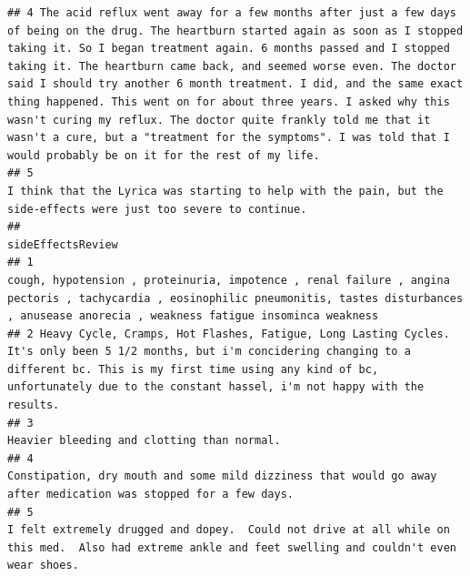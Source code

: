 \documentclass[spanish,]{article}
\begin{document}
\begin{verbatim}
## 4 The acid reflux went away for a few months after just a few days of being on the drug. The heartburn started again as soon as I stopped taking it. So I began treatment again. 6 months passed and I stopped taking it. The heartburn came back, and seemed worse even. The doctor said I should try another 6 month treatment. I did, and the same exact thing happened. This went on for about three years. I asked why this wasn't curing my reflux. The doctor quite frankly told me that it wasn't a cure, but a "treatment for the symptoms". I was told that I would probably be on it for the rest of my life.
## 5                                                                                                                                                                                                                                                                                                                                                                                                                                                                                                     I think that the Lyrica was starting to help with the pain, but the side-effects were just too severe to continue.
##                                                                                                                                                                                                                                                    sideEffectsReview
## 1                                                              cough, hypotension , proteinuria, impotence , renal failure , angina pectoris , tachycardia , eosinophilic pneumonitis, tastes disturbances , anusease anorecia , weakness fatigue insominca weakness
## 2 Heavy Cycle, Cramps, Hot Flashes, Fatigue, Long Lasting Cycles. It's only been 5 1/2 months, but i'm concidering changing to a different bc. This is my first time using any kind of bc, unfortunately due to the constant hassel, i'm not happy with the results.
## 3                                                                                                                                                                                                                         Heavier bleeding and clotting than normal.
## 4                                                                                                                                                    Constipation, dry mouth and some mild dizziness that would go away after medication was stopped for a few days.
## 5                                                                                                             I felt extremely drugged and dopey.  Could not drive at all while on this med.  Also had extreme ankle and feet swelling and couldn't even wear shoes.

\end{verbatim}
\end{document}
